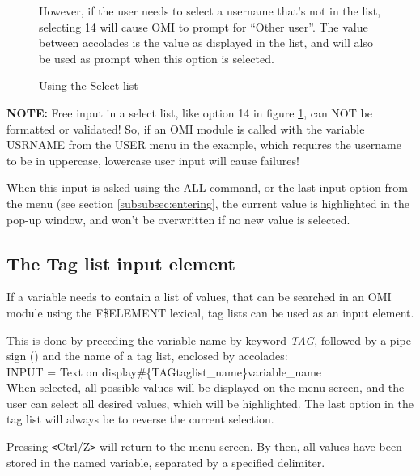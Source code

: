 \documentclass[a4paper]{book}
\newcommand{\vs}{\vspace{3mm}}
\newcommand{\lt}{\texttt{<}}
\newcommand{\gt}{\texttt{>}}
\renewcommand{\indent}{\hspace*{5mm}}
\begin{document}
\begin{figure}[h!tb]
\begin{minipage}[h!tb]{\textwidth}
\noindent However, if the user needs to select a username that's not in the list, 
selecting 14 will cause OMI to prompt for ``Other user''. The value 
between accolades is the value as displayed in the list, and will also be 
used as prompt when this option is selected.

\caption{Using the Select list}\label{fig:freeselect}
\hrulefill
\end{minipage}
\end{figure}

\vs

\hspace{-8mm}\textbf{NOTE:} Free input in a select list, like option 14 in figure \ref{fig:freeselect}, 
can NOT be formatted or validated! So, if an OMI module is called with the 
variable USRNAME from the USER menu in the example, which requires the 
username to be in uppercase, lowercase user input will cause failures!

When this input is asked using the \textsf{ALL} command, or 
the last input option from the menu (see section \ref{subsubsec:entering}, the current value is highlighted in the 
pop-up window, and won't be overwritten if no new value is selected.

\subsection{The Tag list input element}
\label{subsubsec:mylabel40}

If a variable needs to contain a list of values, that can be searched in an 
OMI module using the F{\$}ELEMENT lexical, tag lists can be used as an 
input element.

\vs

This is done by preceding the variable name by keyword \textsl{TAG}, followed by a 
pipe sign (\textbar) and the name of a tag list, enclosed by accolades: \\
\indent\textsf{INPUT = Text on display{\#}{\{}TAG\textbar taglist{\_}name{\}}variable{\_}name} \\
When selected, all possible values will be displayed on the menu screen, and 
the user can select all desired values, which will be highlighted. The last 
option in the tag list will always be to reverse the current selection.

Pressing \lt Ctrl/Z\gt{} will return to the menu screen. By then, all values have 
been stored in the named variable, separated by a specified delimiter.
\end{document}
